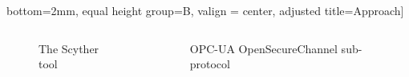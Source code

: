 \documentclass{beamer}
\newcommand{\opcua}{OPC-UA\xspace}
\begin{document}
\begin{frame}[fragile]{}
\begin{tcolorbox}[adjusted title={\centering\large Formal Analysis of Industrial Protocols}]
\begin{columns}[T]
\begin{column}{.65\textwidth}
\begin{tcolorbox}
                bottom=2mm,
                equal height group=B,
                valign = center,
                adjusted title={\large Approach}]
                    \begin{columns}[c]
                        \begin{column}{.45\textwidth}
                            \begin{figure}[htb]
                                \vspace{-1.25em}
                                \caption{The Scyther tool}
                            \end{figure}
                        \end{column}
                        \begin{column}{.55\textwidth}
                            \begin{figure}[htb]
                                \vspace{-1.25em}
                                \caption{\opcua OpenSecureChannel sub-protocol}
                            \end{figure}
                        \end{column}
                    \end{columns}

\end{tcolorbox}
\end{column}
\end{columns}
\end{tcolorbox}
\end{frame}
\end{document}
